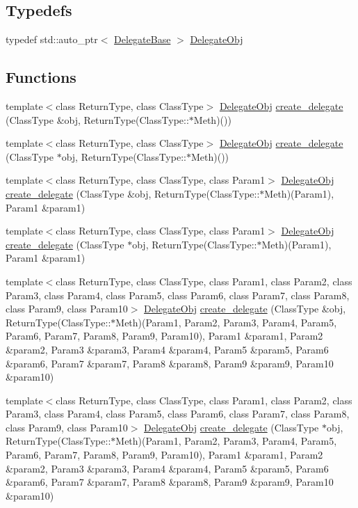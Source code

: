 \subsection*{Typedefs}
\begin{CompactItemize}
\item 
typedef std::auto\_\-ptr$<$ \hyperlink{classDL_1_1DelegateBase}{Delegate\-Base} $>$ \hyperlink{namespaceDL_a0}{Delegate\-Obj}
\end{CompactItemize}
\subsection*{Functions}
\begin{CompactItemize}
\item 
template$<$class Return\-Type, class Class\-Type$>$ \hyperlink{namespaceDL_a0}{Delegate\-Obj} \hyperlink{namespaceDL_a1}{create\_\-delegate} (Class\-Type \&obj, Return\-Type(Class\-Type::$\ast$Meth)())
\item 
template$<$class Return\-Type, class Class\-Type$>$ \hyperlink{namespaceDL_a0}{Delegate\-Obj} \hyperlink{namespaceDL_a2}{create\_\-delegate} (Class\-Type $\ast$obj, Return\-Type(Class\-Type::$\ast$Meth)())
\item 
template$<$class Return\-Type, class Class\-Type, class Param1$>$ \hyperlink{namespaceDL_a0}{Delegate\-Obj} \hyperlink{namespaceDL_a3}{create\_\-delegate} (Class\-Type \&obj, Return\-Type(Class\-Type::$\ast$Meth)(Param1), Param1 \&param1)
\item 
template$<$class Return\-Type, class Class\-Type, class Param1$>$ \hyperlink{namespaceDL_a0}{Delegate\-Obj} \hyperlink{namespaceDL_a4}{create\_\-delegate} (Class\-Type $\ast$obj, Return\-Type(Class\-Type::$\ast$Meth)(Param1), Param1 \&param1)
\item 
template$<$class Return\-Type, class Class\-Type, class Param1, class Param2, class Param3, class Param4, class Param5, class Param6, class Param7, class Param8, class Param9, class Param10$>$ \hyperlink{namespaceDL_a0}{Delegate\-Obj} \hyperlink{namespaceDL_a5}{create\_\-delegate} (Class\-Type \&obj, Return\-Type(Class\-Type::$\ast$Meth)(Param1, Param2, Param3, Param4, Param5, Param6, Param7, Param8, Param9, Param10), Param1 \&param1, Param2 \&param2, Param3 \&param3, Param4 \&param4, Param5 \&param5, Param6 \&param6, Param7 \&param7, Param8 \&param8, Param9 \&param9, Param10 \&param10)
\item 
template$<$class Return\-Type, class Class\-Type, class Param1, class Param2, class Param3, class Param4, class Param5, class Param6, class Param7, class Param8, class Param9, class Param10$>$ \hyperlink{namespaceDL_a0}{Delegate\-Obj} \hyperlink{namespaceDL_a6}{create\_\-delegate} (Class\-Type $\ast$obj, Return\-Type(Class\-Type::$\ast$Meth)(Param1, Param2, Param3, Param4, Param5, Param6, Param7, Param8, Param9, Param10), Param1 \&param1, Param2 \&param2, Param3 \&param3, Param4 \&param4, Param5 \&param5, Param6 \&param6, Param7 \&param7, Param8 \&param8, Param9 \&param9, Param10 \&param10)

\end{CompactItemize}
